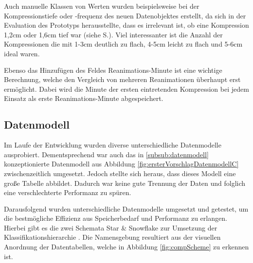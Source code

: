 Auch manuelle Klassen von Werten wurden beispielsweise bei der Kompressionstiefe oder -frequenz des neuen Datenobjektes erstellt, da sich in der Evaluation des Prototyps herausstellte, dass es irrelevant ist, ob eine Kompression 1,2cm oder 1,6cm tief war (siehe S.\pageref{par:binning}).
Viel interessanter ist die Anzahl der Kompressionen die mit 1-3cm deutlich zu flach, 4-5cm leicht zu flach und 5-6cm ideal waren.

Ebenso das Hinzufügen des Feldes \glqq Reanimations-Minute\grqq{} ist eine wichtige Berechnung, welche den Vergleich von mehreren Reanimationen überhaupt erst ermöglicht.
Dabei wird die Minute der ersten eintretenden Kompression bei jedem Einsatz als erste \glqq Reanimations-Minute\grqq{} abgespeichert. 

\subsection{Datenmodell}
\label{sub:datenmodell}
Im Laufe der Entwicklung wurden diverse unterschiedliche Datenmodelle ausprobiert.
Dementsprechend war auch das in \ref{subsub:datenmodell} konzeptionierte Datenmodell aus Abbildung \ref{fig:ersterVorschlagDatenmodellC} zwischenzeitlich umgesetzt.
Jedoch stellte sich heraus, dass dieses Modell eine große Tabelle abbildet.
Dadurch war keine gute Trennung der Daten und folglich eine verschlechterte Performanz zu spüren.

Darausfolgend wurden unterschiedliche Datenmodelle umgesetzt und getestet, um die bestmögliche Effizienz aus Speicherbedarf und Performanz zu erlangen.
Hierbei gibt es die zwei Schemata \glqq Star\grqq{} \& \glqq Snowflake\grqq{} zur Umsetzung der Klassifikationshierarchie \cite{Kimball.2013}.
Die Namensgebung resultiert aus der visuellen Anordnung der Datentabellen, welche in Abbildung \ref{fig:compScheme} zu erkennen ist.

